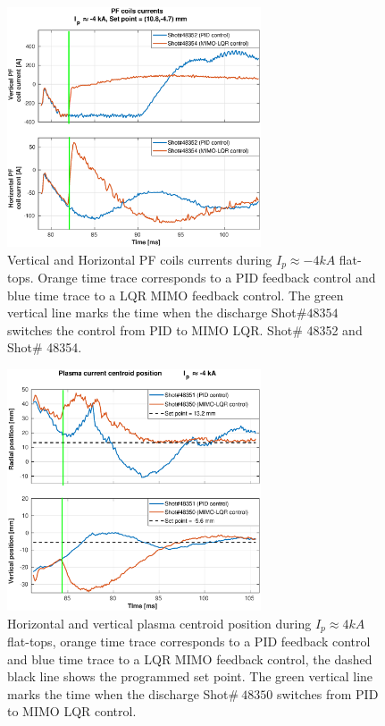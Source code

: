 \begin{figure}
	\centering
	\includegraphics[width=0.67\textwidth]{Chp5/PIDvsMIMO_352_354_curr_2.eps}
	\caption{ Vertical and Horizontal PF coils currents during  $I_p\approx -4kA$  flat-tops. Orange time trace corresponds to a PID feedback control and blue time trace to a LQR MIMO feedback control. The green vertical line marks the time  when the  discharge Shot$\# 48354$ switches the control from PID to MIMO LQR. Shot$\#$ 48352 and Shot$\#$ 48354.}
\end{figure}


\begin{figure}
	\centering
	\includegraphics[width=0.67\textwidth]{Chp5/PIDvsMIMO_351_350_2.eps}
	\caption{Horizontal and vertical plasma centroid position during  $I_p\approx 4kA$  flat-tops, orange time trace corresponds to a PID feedback control and blue time trace to a LQR MIMO feedback control, the dashed black line shows the programmed set point. The green vertical line marks the time  when the  discharge Shot$\# ~48350$ switches  from PID to MIMO LQR control.}
\end{figure}

